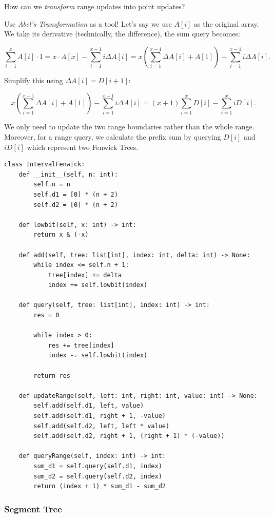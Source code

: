 \documentclass{article}
\begin{document}
How can we \emph{transform} range updates into point updates?

Use \emph{Abel's Transformation} as a tool! Let's say we use $A[i]$ as the original array. We take its derivative (technically, the difference), the sum query becomes:

$$
\sum_{i=1}^x A[i]\cdot 1=x\cdot A[x]-\sum_{i=1}^{x-1}i\Delta A[i]=x\left(\sum_{i=1}^{x-1}\Delta A[i]+A[1]\right)-\sum_{i=1}^{x-1}i\Delta A[i].
$$

Simplify this using $\Delta A[i]=D[i+1]$:

$$
x\left(\sum_{i=1}^{x-1}\Delta A[i]+A[1]\right)-\sum_{i=1}^{x-1}i\Delta A[i]=(x+1)\sum_{i=1}^x D[i]-\sum_{i=1}^x iD[i].
$$

We only need to update the two range boundaries rather than the whole range. Moreover, for a range query, we calculate the prefix sum by querying $D[i]$ and $iD[i]$ which represent two Fenwick Trees.

\begin{lstlisting}[style=python]
class IntervalFenwick:
    def __init__(self, n: int):
        self.n = n
        self.d1 = [0] * (n + 2)
        self.d2 = [0] * (n + 2)

    def lowbit(self, x: int) -> int:
        return x & (-x)

    def add(self, tree: list[int], index: int, delta: int) -> None:
        while index <= self.n + 1:
            tree[index] += delta
            index += self.lowbit(index)

    def query(self, tree: list[int], index: int) -> int:
        res = 0
        
        while index > 0:
            res += tree[index]
            index -= self.lowbit(index)
            
        return res

    def updateRange(self, left: int, right: int, value: int) -> None:
        self.add(self.d1, left, value)
        self.add(self.d1, right + 1, -value)
        self.add(self.d2, left, left * value)
        self.add(self.d2, right + 1, (right + 1) * (-value))

    def queryRange(self, index: int) -> int:
        sum_d1 = self.query(self.d1, index)
        sum_d2 = self.query(self.d2, index)
        return (index + 1) * sum_d1 - sum_d2
\end{lstlisting}


\subsubsection{Segment Tree}
\end{document}
